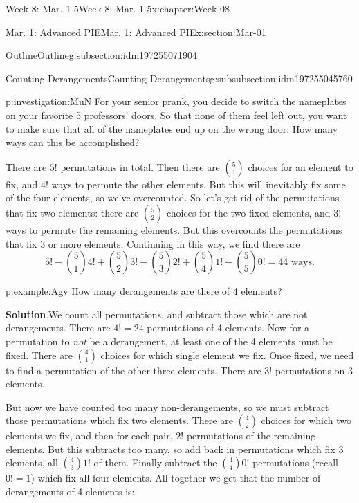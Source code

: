 \documentclass[oneside,10pt,]{book}
\newcommand{\blocktitlefont}{\relax}
\numberwithin{equation}{section}
\begin{document}
\begin{chapterptx}{Week 8: Mar. 1-5}{}{Week 8: Mar. 1-5}{}{}{x:chapter:Week-08}
\begin{sectionptx}{Mar. 1: Advanced PIE}{}{Mar. 1: Advanced PIE}{}{}{x:section:Mar-01}
\begin{subsectionptx}{Outline}{}{Outline}{}{}{g:subsection:idm197255071904}
\typeout{************************************************}
%
\begin{subsubsectionptx}{Counting Derangements}{}{Counting Derangements}{}{}{g:subsubsection:idm197255045760}
\begin{investigation}{}{p:investigation:MuN}%
For your senior prank, you decide to switch the nameplates on your favorite 5 professors' doors. So that none of them feel left out, you want to make sure that all of the nameplates end up on the wrong door. How many ways can this be accomplished?%
\par\smallskip%
\noindent\hypertarget{g:solution:idm197255044336}{}There are \(5!\) permutations in total. Then there are \(\binom{5}{1}\) choices for an element to fix, and \(4!\) ways to permute the other elements. But this will inevitably fix some of the four elements, so we've overcounted. So let's get rid of the permutations that fix two elements: there are \(\binom{5}{2}\) choices for the two fixed elements, and 3! ways to permute the remaining elements. But this overcounts the permutations that fix 3 or more elements. Continuing in this way, we find there are%
%
\begin{equation*}
5! - \binom{5}{1}4! + \binom{5}{2}3! - \binom{5}{3} 2! + \binom{5}{4} 1! - \binom{5}{5}0! = 44 \text{ ways}.
\end{equation*}
\end{investigation}%
\begin{example}{}{p:example:Agv}%
How many derangements are there of 4 elements?%
\par\smallskip%
\noindent\textbf{\blocktitlefont Solution}.\hypertarget{p:solution:GFB}{}\quad{}We count all permutations, and subtract those which are not derangements. There are \(4! = 24\) permutations of 4 elements. Now for a permutation to \emph{not} be a derangement, at least one of the 4 elements must be fixed. There are \({4 \choose 1}\) choices for which single element we fix. Once fixed, we need to find a permutation of the other three elements. There are \(3!\) permutations on 3 elements.%
\par
But now we have counted too many non-derangements, so we must subtract those permutations which fix two elements. There are \({4 \choose 2}\) choices for which two elements we fix, and then for each pair, \(2!\) permutations of the remaining elements. But this subtracts too many, so add back in permutations which fix 3 elements, all \({4 \choose 3}1!\) of them. Finally subtract the \({4 \choose 4}0!\) permutations (recall \(0! = 1\)) which fix all four elements. All together we get that the number of derangements of 4 elements is:%

\end{example}
\end{subsubsectionptx}
\end{subsectionptx}
\end{sectionptx}
\end{chapterptx}
\end{document}
